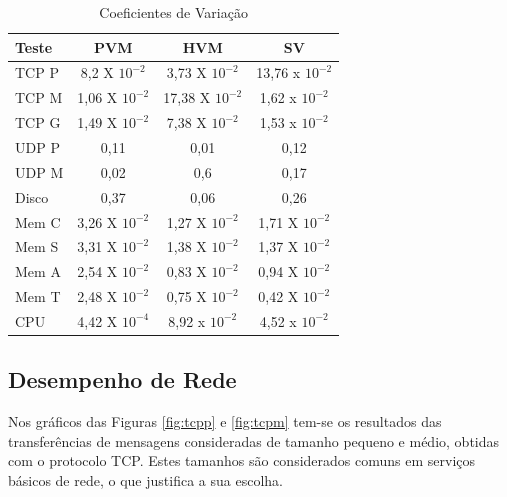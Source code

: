 \documentclass[times, 10pt,twocolumn]{article}
\begin{document}
\begin{table}[ht]
\centering
\caption{Coeficientes de Variação}
\label{t:cv}
    \begin{tabular}{l|c|c|c}
    \hline Teste&	PVM& HVM& SV\\
    \hline TCP P&	8,2 X $10^{-2}$&    3,73 X $10^{-2}$&	13,76 x $10^{-2}$ \\
    \hline TCP M&	1,06 X $10^{-2}$&   17,38 X $10^{-2}$&	1,62 x $10^{-2}$ \\
    \hline TCP G&	1,49 X $10^{-2}$&    7,38 X $10^{-2}$&	1,53 x $10^{-2}$ \\
    \hline UDP P&	0,11&		     0,01&		0,12 \\
    \hline UDP M&	0,02&		     0,6&		0,17 \\
    \hline Disco&	0,37&		     0,06&		0,26\\
    \hline Mem C&	3,26 X $10^{-2}$&    1,27 X $10^{-2}$&	1,71 X $10^{-2}$\\
    \hline Mem S&	3,31 X $10^{-2}$&    1,38 X $10^{-2}$&	1,37 X $10^{-2}$\\
    \hline Mem A&	2,54 X $10^{-2}$&    0,83 X $10^{-2}$&	0,94 X $10^{-2}$\\
    \hline Mem T&	2,48 X $10^{-2}$&    0,75 X $10^{-2}$&	0,42 X $10^{-2}$\\
    \hline CPU&		4,42 X $10^{-4}$&    8,92 x $10^{-2}$&  4,52 x $10^{-2}$\\
    \end{tabular}
\end{table}


\subsection{Desempenho de Rede}
Nos gráficos das Figuras \ref{fig:tcpp} e \ref{fig:tcpm} tem-se os resultados das 
transferências de mensagens consideradas de tamanho pequeno e médio, obtidas com 
o protocolo TCP. Estes tamanhos são considerados comuns em serviços básicos de rede, 
o que justifica a sua escolha. 
\end{document}

